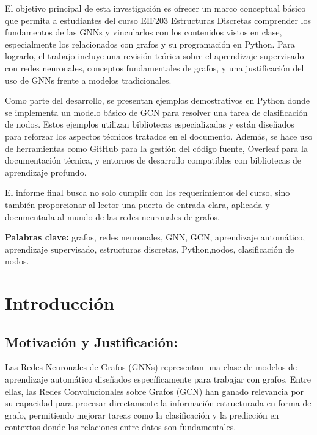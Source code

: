 \documentclass[11pt]{article} %
\begin{document}
El objetivo principal de esta investigación es ofrecer un marco conceptual básico que permita a estudiantes del curso EIF203 Estructuras Discretas comprender los fundamentos de las GNNs y vincularlos con los contenidos vistos en clase, especialmente los relacionados con grafos y su programación en Python. Para lograrlo, el trabajo incluye una revisión teórica sobre el aprendizaje supervisado con redes neuronales, conceptos fundamentales de grafos, y una justificación del uso de GNNs frente a modelos tradicionales.

Como parte del desarrollo, se presentan ejemplos demostrativos en Python donde se implementa un modelo básico de GCN para resolver una tarea de clasificación de nodos. Estos ejemplos utilizan bibliotecas especializadas y están diseñados para reforzar los aspectos técnicos tratados en el documento. Además, se hace uso de herramientas como GitHub para la gestión del código fuente, Overleaf para la documentación técnica, y entornos de desarrollo compatibles con bibliotecas de aprendizaje profundo.

El informe final busca no solo cumplir con los requerimientos del curso, sino también proporcionar al lector una puerta de entrada clara, aplicada y documentada al mundo de las redes neuronales de grafos.

\vspace{5pt}
\textbf{Palabras clave:} grafos, redes neuronales, GNN, GCN, aprendizaje automático, aprendizaje supervisado, estructuras discretas, Python,nodos, clasificación de nodos.

\newpage
\tableofcontents
\listoftables
\listoffigures
\newpage
\section{{Introducción}}
\vspace{5pt}
\subsection{Motivación y Justificación: }
\vspace{3pt}
Las Redes Neuronales de Grafos (GNNs) representan una clase de modelos de aprendizaje automático diseñados específicamente para trabajar con grafos. Entre ellas, las Redes Convolucionales sobre Grafos (GCN) han ganado relevancia por su capacidad para procesar directamente la información estructurada en forma de grafo, permitiendo mejorar tareas como la clasificación y la predicción en contextos donde las relaciones entre datos son fundamentales. 
\end{document}
